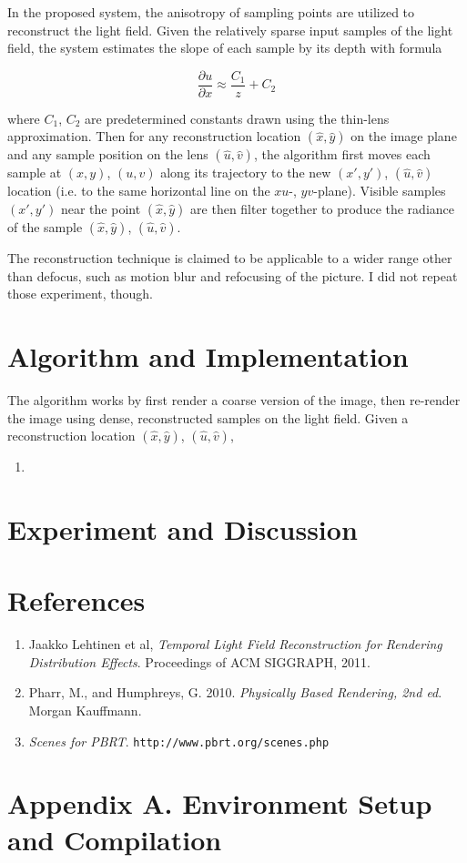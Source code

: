\documentclass{article}
\begin{document}
In the proposed system, the anisotropy of sampling points are utilized to reconstruct the light field. Given the relatively sparse input samples of the light field, the system estimates the slope of each sample by its depth with formula

\[ \frac{\partial u}{\partial x}\approx \frac{C_1}{z} + C_2 \]

where $C_1$, $C_2$ are predetermined constants drawn using the thin-lens approximation. Then for any reconstruction location $(\hat{x},\hat{y})$ on the image plane and any sample position on the lens $(\hat{u},\hat{v})$, the algorithm first moves each sample at $(x,y)$, $(u,v)$ along its trajectory to the new $(x',y')$, $(\hat{u},\hat{v})$ location (i.e. to the same horizontal line on the $xu$-, $yv$-plane). Visible samples $(x',y')$ near the point $(\hat{x},\hat{y})$ are then filter together to produce the radiance of the sample $(\hat{x},\hat{y})$, $(\hat{u},\hat{v})$.

The reconstruction technique is claimed to be applicable to a wider range other than defocus, such as motion blur and refocusing of the picture. I did not repeat those experiment, though.

\section{Algorithm and Implementation}
The algorithm works by first render a coarse version of the image, then re-render the image using dense, reconstructed samples on the light field. Given a reconstruction location $(\hat{x},\hat{y})$, $(\hat{u},\hat{v})$,

\begin{enumerate}
\item 
\end{enumerate}

\section{Experiment and Discussion}
\section{References}
\begin{enumerate}
\item Jaakko Lehtinen et al, \textit{Temporal Light Field Reconstruction for Rendering Distribution Effects}. Proceedings of ACM SIGGRAPH, 2011.
\item Pharr, M., and Humphreys, G. 2010. \textit{Physically Based Rendering, 2nd ed}. Morgan Kauffmann.
\item \textit{Scenes for PBRT}. \texttt{http://www.pbrt.org/scenes.php}
\end{enumerate}
\section*{Appendix A. Environment Setup and Compilation}
\end{document}
